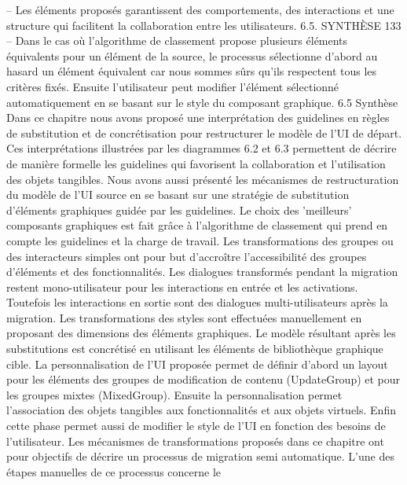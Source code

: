 \documentclass{article}
\begin{document}
– Les \'{e}l\'{e}ments propos\'{e}s garantissent des comportements, des interactions et une structure qui
facilitent la collaboration entre les utilisateurs.
6.5. SYNTHÈSE
133
– Dans le cas o\`{u} l’algorithme de classement propose plusieurs \'{e}l\'{e}ments \'{e}quivalents pour un \'{e}l\'{e}ment de la source, le processus s\'{e}lectionne d’abord au hasard un \'{e}l\'{e}ment \'{e}quivalent car nous
sommes s\^{u}rs qu’ils respectent tous les crit\`{e}res ﬁx\'{e}s. Ensuite l’utilisateur peut modiﬁer l’\'{e}l\'{e}ment s\'{e}lectionn\'{e} automatiquement en se basant sur le style du composant graphique.
6.5
Synth\`{e}se
Dans ce chapitre nous avons propos\'{e} une interpr\'{e}tation des guidelines en r\`{e}gles de substitution
et de concr\'{e}tisation pour restructurer le mod\`{e}le de l’UI de d\'{e}part. Ces interpr\'{e}tations illustr\'{e}es par
les diagrammes 6.2 et 6.3 permettent de d\'{e}crire de mani\`{e}re formelle les guidelines qui favorisent la
collaboration et l’utilisation des objets tangibles.
Nous avons aussi pr\'{e}sent\'{e} les m\'{e}canismes de restructuration du mod\`{e}le de l’UI source en se
basant sur une strat\'{e}gie de substitution d’\'{e}l\'{e}ments graphiques guid\'{e}e par les guidelines. Le choix des
’meilleurs’ composants graphiques est fait gr\^{a}ce \`{a} l’algorithme de classement qui prend en compte
les guidelines et la charge de travail.
Les transformations des groupes ou des interacteurs simples ont pour but d’accro\^{i}tre l’accessibilit\'{e}
des groupes d’\'{e}l\'{e}ments et des fonctionnalit\'{e}s. Les dialogues transform\'{e}s pendant la migration restent
mono-utilisateur pour les interactions en entr\'{e}e et les activations. Toutefois les interactions en sortie
sont des dialogues multi-utilisateurs apr\`{e}s la migration. Les transformations des styles sont effectu\'{e}es
manuellement en proposant des dimensions des \'{e}l\'{e}ments graphiques.
Le mod\`{e}le r\'{e}sultant apr\`{e}s les substitutions est concr\'{e}tis\'{e} en utilisant les \'{e}l\'{e}ments de biblioth\`{e}que
graphique cible. La personnalisation de l’UI propos\'{e}e permet de d\'{e}ﬁnir d’abord un layout pour les
\'{e}l\'{e}ments des groupes de modiﬁcation de contenu (UpdateGroup) et pour les groupes mixtes (MixedGroup). Ensuite la personnalisation permet l’association des objets tangibles aux fonctionnalit\'{e}s et
aux objets virtuels. Enﬁn cette phase permet aussi de modiﬁer le style de l’UI en fonction des besoins
de l’utilisateur.
Les m\'{e}canismes de transformations propos\'{e}s dans ce chapitre ont pour objectifs de d\'{e}crire un
processus de migration semi automatique. L’une des \'{e}tapes manuelles de ce processus concerne le
\end{document}
